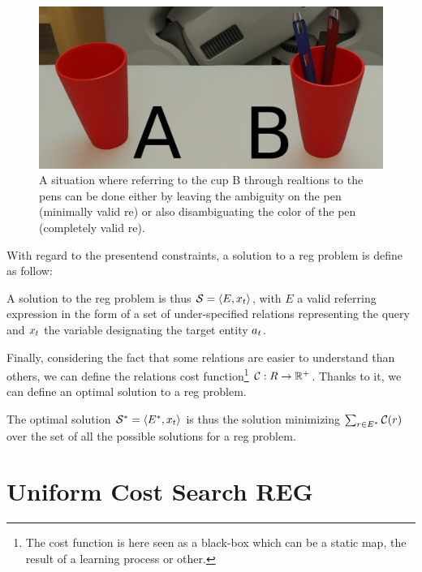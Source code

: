 \begin{figure}[ht!]
\centering
\includegraphics[scale=0.15]{figures/chapter4/complet_validity.png}
\caption{\label{fig:chap4_complet} A situation where referring to the cup B through realtions to the pens can be done either by leaving the ambiguity on the pen (minimally valid \acrshort{re}) or also disambiguating the color of the pen (completely valid \acrshort{re}). }
\end{figure}

With regard to the presentend constraints, a solution to a \acrshort{reg} problem is define as follow:

\begin{definition}
A solution to the \acrshort{reg} problem is thus $\mathcal{S} = \langle E, x_t \rangle$, with $E$ a valid referring expression in the form of a set of under-specified relations representing the \sparql{} query and $x_t$ the variable designating the target entity $a_t$.
\end{definition}


Finally, considering the fact that some relations are easier to understand than others, we can define the relations cost function\footnote{The cost function is here seen as a black-box which can be a static map, the result of a learning process or other.} $\mathcal{C} : R \rightarrow \mathbb{R}^+$. Thanks to it, we can define an optimal solution to a \acrshort{reg} problem.

\begin{definition}
The optimal solution $\mathcal{S}^* = \langle E^*, x_t \rangle$ is thus the solution minimizing $\sum_{r \in E^*} \mathcal{C}(r)$ over the set of all the possible solutions for a \acrshort{reg} problem.
\end{definition}


\section{Uniform Cost Search REG}

